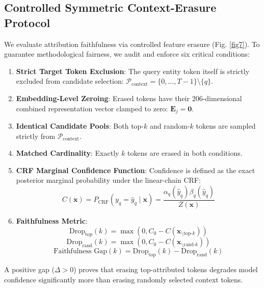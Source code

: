 \documentclass[default,iicol]{sn-jnl}
\begin{document}
\subsection{Controlled Symmetric Context-Erasure Protocol}
We evaluate attribution faithfulness via controlled feature erasure (Fig. \ref{fig7}). To guarantee methodological fairness, we audit and enforce six critical conditions:
\begin{enumerate}
    \item \textbf{Strict Target Token Exclusion}: The query entity token itself is strictly excluded from candidate selection: $\mathcal{P}_{\text{context}} = \{0, \dots, T-1\} \setminus \{q\}$.
    \item \textbf{Embedding-Level Zeroing}: Erased tokens have their 206-dimensional combined representation vector clamped to zero: $\mathbf{E}_j = \mathbf{0}$.
    \item \textbf{Identical Candidate Pools}: Both top-$k$ and random-$k$ tokens are sampled strictly from $\mathcal{P}_{\text{context}}$.
    \item \textbf{Matched Cardinality}: Exactly $k$ tokens are erased in both conditions.
    \item \textbf{CRF Marginal Confidence Function}: Confidence is defined as the exact posterior marginal probability under the linear-chain CRF:
    \begin{equation}
    C(\mathbf{x}) = P_{\text{CRF}}(y_q = \hat{y}_q \mid \mathbf{x}) = \frac{\alpha_q(\hat{y}_q) \beta_q(\hat{y}_q)}{Z(\mathbf{x})}
    \end{equation}
    \item \textbf{Faithfulness Metric}:
    \begin{equation}
    \text{Drop}_{\text{top}}(k) = \max\left(0, C_0 - C(\mathbf{x}_{\setminus \text{top-}k})\right)
    \end{equation}
    \begin{equation}
    \text{Drop}_{\text{rand}}(k) = \max\left(0, C_0 - C(\mathbf{x}_{\setminus \text{rand-}k})\right)
    \end{equation}
    \begin{equation}
    \text{Faithfulness Gap}(k) = \text{Drop}_{\text{top}}(k) - \text{Drop}_{\text{rand}}(k)
    \end{equation}
\end{enumerate}
A positive gap ($\Delta > 0$) proves that erasing top-attributed tokens degrades model confidence significantly more than erasing randomly selected context tokens.
\end{document}
